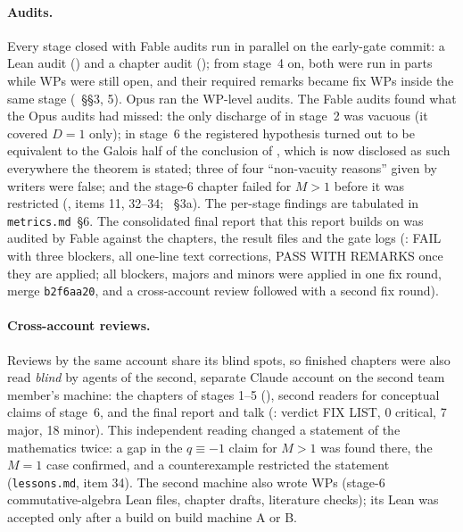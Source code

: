 \begin{sloppypar}
\paragraph{Audits.} Every stage closed with Fable audits run in parallel on the early-gate commit: a Lean audit
() and a chapter audit ();
from stage~4 on, both were run in parts while WPs were still open, and their required remarks became fix WPs inside the
same stage (~\S\S3, 5). Opus ran the WP-level audits. The Fable audits found
what the Opus audits had missed: the only discharge of  in stage~2 was vacuous (it covered
$D = 1$ only); in stage~6 the registered hypothesis  turned out to be equivalent to the
Galois half of the conclusion of , which is now disclosed as such everywhere the theorem
is stated; three of four ``non-vacuity reasons'' given by writers were false; and the stage-6 chapter failed for
$M > 1$ before it was restricted (, items 11, 32--34;
~\S3a). The per-stage findings are tabulated in \texttt{metrics.md}~\S6. The consolidated
final report that this report builds on was audited by Fable against the chapters, the result files and the gate logs
(: FAIL with three blockers, all one-line text
corrections, PASS WITH REMARKS once they are applied; all blockers, majors and minors were applied in one fix round, merge \texttt{b2f6aa20}, and a cross-account review followed with a second fix round).

\paragraph{Cross-account reviews.} Reviews by the same account share its blind spots, so finished chapters were also
read \emph{blind} by agents of the second, separate Claude account on the second team member's machine: the chapters
of stages 1--5 (), second readers for conceptual claims of stage~6,
and the final report and talk (: verdict FIX LIST, 0 critical,
7 major, 18 minor). This independent reading changed a statement of the mathematics twice: a gap in the
$q \equiv -1$ claim for $M > 1$ was found there, the $M = 1$ case confirmed, and a counterexample restricted the
statement (\texttt{lessons.md}, item 34). The second machine also wrote WPs (stage-6 commutative-algebra Lean files,
chapter drafts, literature checks); its Lean was accepted only after a build on build machine A or B.


\end{sloppypar}
